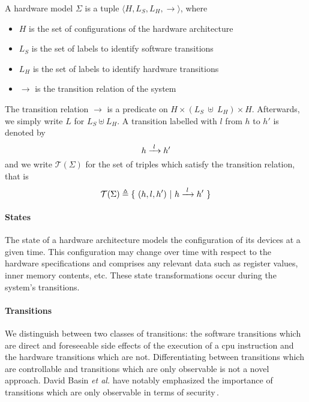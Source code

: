 \begin{definition}
  \label{def:speccert:model}
  A hardware model $\Sigma$ is a tuple
  $\langle H, L_S, L_H, \rightarrow \rangle$, where
  \begin{itemize}
  \item $H$ is the set of configurations of the hardware architecture
  \item $L_S$ is the set of labels to identify software transitions
  \item $L_H$ is the set of labels to identify hardware transitions
  \item $\rightarrow$ is the transition relation of the system
  \end{itemize}

  The transition relation $\rightarrow$ is a predicate on
  $H \times (L_S~\uplus~L_H) \times H$.
  Afterwards, we simply write $L$ for $L_S \uplus L_H$.
  A transition labelled with $l$ from $h$ to $h'$ is denoted by
  \[
    h \xrightarrow{\hskip0.3em\relax l\hskip0.3em\relax} h'
  \]
  and we write $\mathcal{T}(\Sigma)$ for the set of triples which satisfy the
  transition relation, that is
  \[
    \mathcal{T}(\Sigma) \triangleq \{\ (h, l, h')\ |\ h \xrightarrow{\hskip0.3em\relax l\hskip0.3em\relax} h'\ \}
  \]
\end{definition}

\paragraph{States}
%
The state of a hardware architecture models the configuration of its devices at
a given time.
%
This configuration may change over time with respect to the hardware
specifications and comprises any relevant data such as register values, inner
memory contents, etc.
%
These state transformations occur during the system's transitions.

\paragraph{Transitions}
%
We distinguish between two classes of transitions: the software transitions
which are direct and foreseeable side effects of the execution of a \ac{cpu}
instruction and the hardware transitions which are not.
%
Differentiating between transitions which are controllable and transitions which
are only observable is not a novel approach.
%
David Basin \emph{et al.} have notably emphasized the importance of transitions
which are only observable in terms of security\,\cite{basin2013enforceable}.

